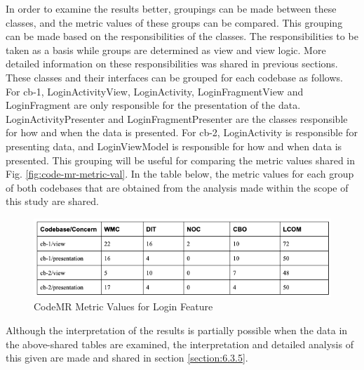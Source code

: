 In order to examine the results better, groupings can be made between these classes, and the metric values of these groups can be compared. This grouping can be made based on the responsibilities of the classes. The responsibilities to be taken as a basis while groups are determined as view and view logic. More detailed information on these responsibilities was shared in previous sections. These classes and their interfaces can be grouped for each codebase as follows. For cb-1, LoginActivityView, LoginActivity, LoginFragmentView and LoginFragment are only responsible for the presentation of the data.  LoginActivityPresenter and LoginFragmentPresenter are the classes responsible for how and when the data is presented. For cb-2, LoginActivity is responsible for presenting data, and LoginViewModel is responsible for how and when data is presented. This grouping will be useful for comparing the metric values shared in Fig. \ref{fig:code-mr-metric-val}. In the table below, the metric values for each group of both codebases that are obtained from the analysis made within the scope of this study are shared.

\begin{figure}[ht!]
    \centering
    \includegraphics[scale=0.65]{figures/login-metric-table-2.png}
    \caption{CodeMR Metric Values for Login Feature}
    \label{fig:login-metric-table-2}
\end{figure}
\FloatBarrier

Although the interpretation of the results is partially possible when the data in the above-shared tables are examined, the interpretation and detailed analysis of this given are made and shared in section \ref{section:6.3.5}.